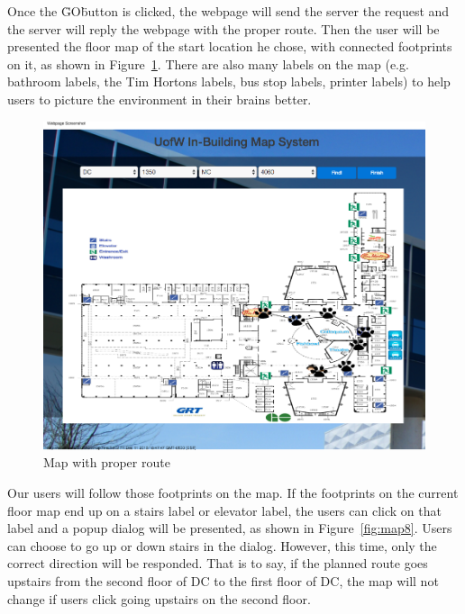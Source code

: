 \documentclass{sigchi}
\begin{document}
Once the \"GO\" button is clicked, the webpage will send the server the request and the server will reply the webpage with the proper route. Then the user will be presented the floor map of the start location he chose, with connected footprints on it, as shown in Figure~\ref{fig:map7}. There are also many labels on the map (e.g. bathroom labels, the Tim Hortons labels, bus stop labels, printer labels) to help users to picture the environment in their brains better. 

\begin{figure}[!h]
\centering
\includegraphics[width=1.0\columnwidth]{pics/map7.png}
\caption{Map with proper route}
\label{fig:map7}
\end{figure}

Our users will follow those footprints on the map. If the footprints on the current floor map end up on a stairs label or elevator label, the users can click on that label and a popup dialog will be presented, as shown in Figure~\ref{fig:map8}. Users can choose to go up or down stairs in the dialog. However, this time, only the correct direction will be responded. That is to say, if the planned route goes upstairs from the second floor of DC to the first floor of DC, the map will not change if users click going upstairs on the second floor.
\end{document}
